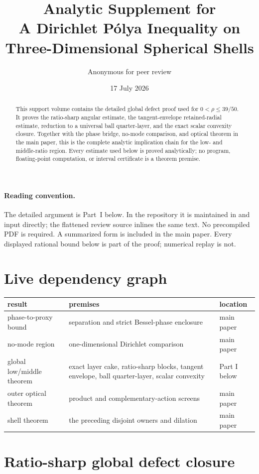 \documentclass[11pt]{article}
\title{Analytic Supplement for\\
A Dirichlet P\'olya Inequality on\\
Three-Dimensional Spherical Shells}
\author{Anonymous for peer review}
\date{17 July 2026}
\theoremstyle{remark}
\begin{document}
\maketitle

\begin{abstract}
This support volume contains the detailed global defect proof used for
$0<\rho\leq39/50$.  It proves the ratio-sharp angular estimate, the
tangent-envelope retained-radial estimate, reduction to a universal ball
quarter-layer, and the exact scalar convexity closure.  Together with the
phase bridge, no-mode comparison, and optical theorem in the main paper,
this is the complete analytic implication chain for the low- and middle-ratio
region.  Every estimate used below is proved analytically; no program,
floating-point computation, or interval certificate is a theorem premise.
\end{abstract}

\paragraph{Reading convention.}
The detailed argument is Part~I below.  In the repository it is maintained in
 and input directly; the
flattened review source inlines the same text.  No precompiled PDF is required.
A summarized form is included in the main paper.  Every displayed rational
bound below is part of the proof; numerical replay is not.

\section*{Live dependency graph}

\begin{center}
\small
\renewcommand{\arraystretch}{1.15}
\begin{tabular}{@{}p{3.3cm}p{5.1cm}p{3.2cm}@{}}
\toprule
result&premises&location\\
\midrule
phase-to-proxy bound&
separation and strict Bessel-phase enclosure&
main paper\\
no-mode region&
one-dimensional Dirichlet comparison&
main paper\\
global low/middle theorem&
exact layer cake, ratio-sharp blocks, tangent envelope,
ball quarter-layer, scalar convexity&
Part I below\\
outer optical theorem&
product and complementary-action screens&
main paper\\
shell theorem&
the preceding disjoint owners and dilation&
main paper\\
\bottomrule
\end{tabular}
\end{center}

\renewcommand{\thesection}{\Roman{section}}
\tableofcontents
\clearpage

\section{Ratio-sharp global defect closure}
\label{part:ratio}


\end{document}

